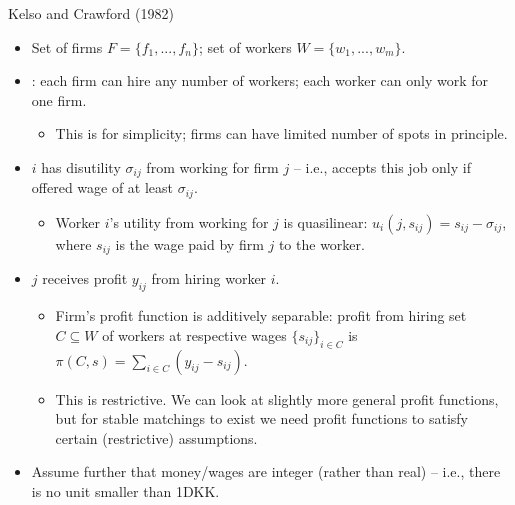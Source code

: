 \documentclass[english,10pt
,aspectratio=169
]{beamer}
\begin{document}
\begin{frame}{Kelso and Crawford (1982)}
\begin{itemize}
	\item Set of firms $F = \{f_1, ..., f_n\}$; set of workers $W = \{w_1, ..., w_m\}$.
	\item {}: each firm can hire any number of workers; each worker can only work for one firm.
	\begin{itemize}
		\item This is for simplicity; firms can have limited number of spots in principle.
	\end{itemize}
	\item {} $i$ has disutility $\sigma_{ij}$ from working for firm $j$ -- i.e., accepts this job only if offered wage of at least $\sigma_{ij}$.
	\begin{itemize}
		\item Worker $i$'s utility from working for $j$ is quasilinear: \alert{$u_i(j,s_{ij}) = s_{ij} - \sigma_{ij}$}, where $s_{ij}$ is the wage paid by firm $j$ to the worker.
	\end{itemize}
	\item {} $j$ receives profit $y_{ij}$ from hiring worker $i$.
	\begin{itemize}
		\item Firm's profit function is additively separable: profit from hiring set $C \subseteq W$ of workers at respective wages $\{s_{ij}\}_{i \in C}$ is \alert{$\pi(C,s) = \sum_{i \in C} (y_{ij} - s_{ij})$}.
		\item This is \alert{restrictive}. We can look at slightly more general profit functions, but for stable matchings to exist we need profit functions to satisfy certain (restrictive) assumptions.
	\end{itemize}
	\item Assume further that money/wages are integer (rather than real) -- i.e., there is no unit smaller than 1DKK.
\end{itemize}
\end{frame}
\end{document}
